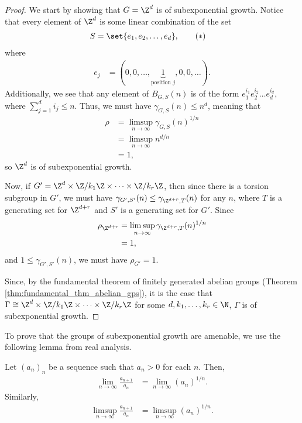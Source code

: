 \documentclass[10pt]{mypackage2}
\begin{document}
\begin{proof}
  We start by showing that $G = \Z^d$ is of subexponential growth. Notice that every element of $\Z^d$ is some linear combination of the set
  \begin{align*}
    S &= \set{e_1,e_2,\dots,e_d},\label{eq:generating_set_free_abelian_group}\tag{\textasteriskcentered}
  \end{align*}
  where
  \begin{align*}
    e_{j} &= (0,0,\dots,\underbrace{1}_{\text{position $j$}},0,0,\dots).
  \end{align*}
  Additionally, we see that any element of $B_{G,S}(n)$ is of the form $e_1^{i_1}e_2^{i_2}\dots e_d^{i_d}$, where $\sum_{j=1}^{d} i_j \leq n$. Thus, we must have $\gamma_{G,S}(n) \leq n^{d}$, meaning that 
  \begin{align*}
    \rho &= \limsup_{n\rightarrow\infty} \gamma_{G,S}(n)^{1/n}\\
         &= \limsup_{n\rightarrow\infty}n^{d/n}\\
         &= 1,
  \end{align*}
  so $\Z^d$ is of subexponential growth.\newline

  Now, if $G' = \Z^d\times \Z/k_1\Z\times \cdots \times \Z/k_r\Z$, then since there is a torsion subgroup in $G'$, we must have $\gamma_{G',S'}(n) \leq \gamma_{\Z^{d+r},T}(n)$ for any $n$, where $T$ is a generating set for $\Z^{d+r}$ and $S'$ is a generating set for $G'$. Since
  \begin{align*}
    \rho_{\Z^{d+r}} &= \limsup_{n\rightarrow\infty}\gamma_{\Z^{d+r},T}(n)^{1/n}\\
                    &= 1,
  \end{align*}
  and $1 \leq \gamma_{G',S'}(n)$, we must have $\rho_{G'} = 1$.\newline

  Since, by the fundamental theorem of finitely generated abelian groups (Theorem \ref{thm:fundamental_thm_abelian_gps}), it is the case that $\Gamma\cong \Z^{d}\times \Z/k_1\Z\times\cdots\times \Z/k_r\Z$ for some $d,k_1,\dots,k_r\in \N$, $\Gamma$ is of subexponential growth.
\end{proof}
To prove that the groups of subexponential growth are amenable, we use the following lemma from real analysis.
\begin{lemma}
  Let $\left(a_n\right)_n$ be a sequence such that $a_n > 0$ for each $n$. Then,
  \begin{align*}
    \lim_{n\rightarrow\infty}\frac{a_{n+1}}{a_n} &= \lim_{n\rightarrow\infty} \left(a_n\right)^{1/n}.
  \end{align*}
  Similarly,
  \begin{align*}
    \limsup_{n\rightarrow\infty}\frac{a_{n+1}}{a_n} &= \limsup_{n\rightarrow\infty}\left(a_n\right)^{1/n}.
  \end{align*}
\end{lemma}
\end{document}
